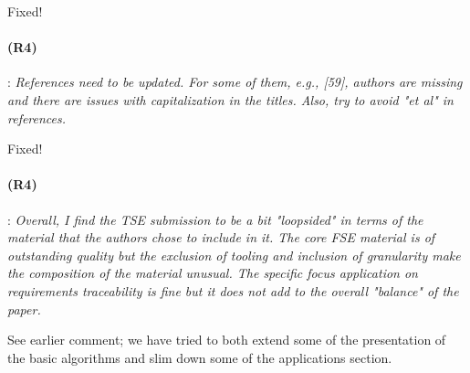 \documentclass{article}
\begin{document}
Fixed!

\paragraph{(R4)}: \textit{References need to be updated. For some of them, e.g., [59], authors are missing and there are issues with capitalization in the titles. Also, try to avoid "et al" in references.}
\vspace{0.05in}

Fixed!

\paragraph{(R4)}: \textit{Overall, I find the TSE submission to be a bit "loopsided" in terms of the material that the authors chose to include in it. The core FSE material is of outstanding quality but the exclusion of tooling and inclusion of granularity make the composition of the material unusual. The specific focus application on requirements traceability is fine but it does not add to the overall "balance" of the paper.}
\vspace{0.05in}

See earlier comment; we have tried to both extend some of the presentation of the basic algorithms and slim down some of the applications section.  
\end{document}
